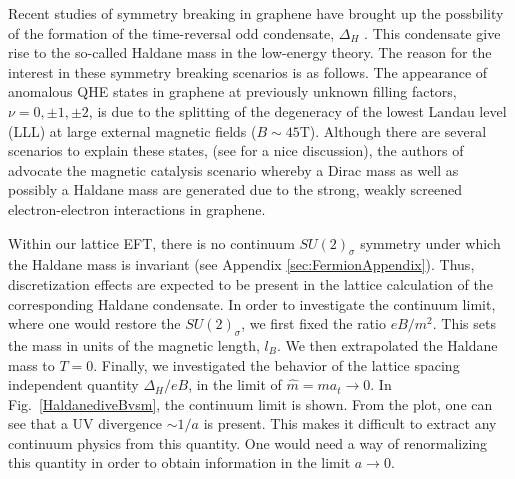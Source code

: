 \documentclass[aps,prd,twocolumn,showpacs,superscriptaddress,groupedaddress]{revtex4}  %
\begin{document}
Recent studies of symmetry breaking in graphene have brought up the possbility of the formation of the time-reversal odd condensate, $\Delta_H$ \cite{MiranskyGraphene2,MiranskyGraphene3}. This condensate give rise to the so-called Haldane mass in the low-energy theory.
The reason for the interest in these symmetry breaking scenarios is as follows.
The appearance of anomalous QHE states in graphene at previously unknown filling factors, $\nu = 0, \pm 1, \pm 2$, is due to the splitting of the degeneracy of the lowest Landau level (LLL) at large external magnetic fields ($B \sim 45 \text{T}$).
Although there are several scenarios to explain these states, (see \cite{Yang} for a nice discussion), the authors of \cite{MiranskyGraphene2, MiranskyGraphene3} advocate the magnetic catalysis scenario whereby a Dirac mass as well as possibly a Haldane mass are generated due to the strong, weakly screened
electron-electron interactions in graphene.

Within our lattice EFT, there is no continuum $SU(2)_{\sigma}$ symmetry under which the Haldane mass is invariant (see Appendix \ref{sec:FermionAppendix}). Thus, discretization effects are expected to be present in the lattice calculation of the corresponding Haldane condensate. In order to investigate the continuum limit, where one would restore the $SU(2)_{\sigma}$, we first fixed the ratio $eB/m^2$. This sets the mass in units of the magnetic length, $l_B$. We then extrapolated the Haldane mass to $T=0$. Finally, we investigated the behavior of the lattice spacing independent quantity $\Delta_H/eB$, in the limit of $\hat{m} = m a_t \to 0$. 
In Fig.~\ref{HaldanediveBvsm}, the continuum limit is shown. From the plot, one can see that a UV divergence $\sim 1/a$ is present. This makes it difficult to extract any continuum physics from this quantity. One would need a way of renormalizing this quantity in order to obtain information in the limit $a \to 0$.
\end{document}
